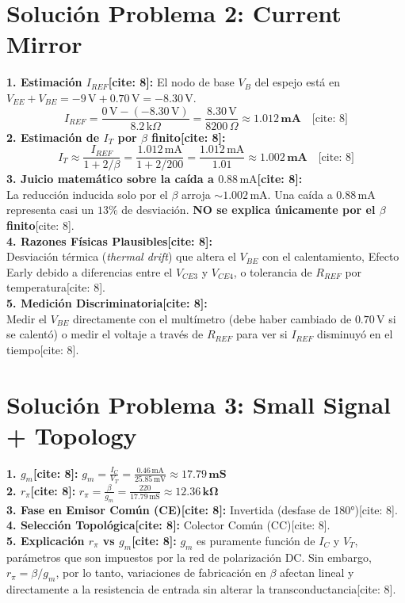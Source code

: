 \documentclass[11pt, a4paper]{article}
\begin{document}
\section*{Solución Problema 2: Current Mirror}
\textbf{1. Estimación $I_{REF}$[cite: 8]:}
El nodo de base $V_B$ del espejo está en $V_{EE} + V_{BE} = -9\,\text{V} + 0.70\,\text{V} = -8.30\,\text{V}$.
\begin{equation*}
    I_{REF} = \frac{0\,\text{V} - (-8.30\,\text{V})}{8.2\,\text{k}\Omega} = \frac{8.30\,\text{V}}{8200\,\Omega} \approx \mathbf{1.012\,\text{mA}} \quad \text{[cite: 8]}
\end{equation*}
\textbf{2. Estimación de $I_T$ por $\beta$ finito[cite: 8]:}
\begin{equation*}
    I_T \approx \frac{I_{REF}}{1 + 2/\beta} = \frac{1.012\,\text{mA}}{1 + 2/200} = \frac{1.012\,\text{mA}}{1.01} \approx \mathbf{1.002\,\text{mA}} \quad \text{[cite: 8]}
\end{equation*}
\textbf{3. Juicio matemático sobre la caída a $0.88\,\text{mA}$[cite: 8]:} \\
La reducción inducida solo por el $\beta$ arroja $\sim 1.002\,\text{mA}$. Una caída a $0.88\,\text{mA}$ representa casi un $13\%$ de desviación. \textbf{NO se explica únicamente por el $\beta$ finito}[cite: 8]. \\
\textbf{4. Razones Físicas Plausibles[cite: 8]:} \\
Desviación térmica (\textit{thermal drift}) que altera el $V_{BE}$ con el calentamiento, Efecto Early debido a diferencias entre el $V_{CE3}$ y $V_{CE4}$, o tolerancia de $R_{REF}$ por temperatura[cite: 8]. \\
\textbf{5. Medición Discriminatoria[cite: 8]:} \\
Medir el $V_{BE}$ directamente con el multímetro (debe haber cambiado de $0.70\,\text{V}$ si se calentó) o medir el voltaje a través de $R_{REF}$ para ver si $I_{REF}$ disminuyó en el tiempo[cite: 8].

\section*{Solución Problema 3: Small Signal + Topology}
\textbf{1. $g_m$[cite: 8]:} \quad $\displaystyle g_m = \frac{I_C}{V_T} = \frac{0.46\,\text{mA}}{25.85\,\text{mV}} \approx \mathbf{17.79\,\text{mS}}$ \\
\textbf{2. $r_\pi$[cite: 8]:} \quad $\displaystyle r_\pi = \frac{\beta}{g_m} = \frac{220}{17.79\,\text{mS}} \approx \mathbf{12.36\,\text{k}\Omega}$ \\
\textbf{3. Fase en Emisor Común (CE)[cite: 8]:} Invertida (desfase de 180°)[cite: 8]. \\
\textbf{4. Selección Topológica[cite: 8]:} Colector Común (CC)[cite: 8]. \\
\textbf{5. Explicación $r_\pi$ vs $g_m$[cite: 8]:} $g_m$ es puramente función de $I_C$ y $V_T$, parámetros que son impuestos por la red de polarización DC. Sin embargo, $r_\pi = \beta / g_m$, por lo tanto, variaciones de fabricación en $\beta$ afectan lineal y directamente a la resistencia de entrada sin alterar la transconductancia[cite: 8].
\end{document}
